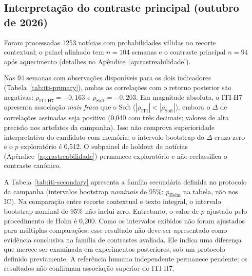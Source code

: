 \subsection{Interpretação do contraste principal (outubro de 2026)}
\label{subsec:campanha-iti}

Foram processadas 1253 notícias com probabilidades válidas no recorte contextual; o painel alinhado tem $n=104$ semanas e o contraste principal $n=94$ após aquecimento (detalhes no Apêndice~\ref{ap:rastreabilidade}).

Nas 94 semanas com observações disponíveis para os dois indicadores (Tabela~\ref{tab:iti-primary}), ambas as correlações com o retorno posterior são negativas: $\rho_{\mathrm{ITI\text{-}H7}}=-0,163$ e $\rho_{\mathrm{Soft}}=-0,203$. Em magnitude absoluta, o ITI-H7 apresenta associação \emph{mais fraca} que o Soft ($|\rho_{\mathrm{ITI}}|<|\rho_{\mathrm{Soft}}|$), embora o $\Delta$ de correlações assinadas seja positivo (0,040 com três decimais; valores de alta precisão nos artefatos da campanha). Isso não comprova superioridade interpretativa do candidato com memória; o intervalo bootstrap do $\Delta$ cruza zero e o $p$ exploratório é 0,512.  O subpainel de holdout de notícias (Apêndice~\ref{ap:rastreabilidade}) permanece exploratório e não reclassifica o contraste canônico.

A Tabela~\ref{tab:iti-secondary} apresenta a família secundária definida no protocolo da campanha (intervalos bootstrap \emph{nominais} de 95\%; $p_{\mathrm{Holm}}$ na tabela, não nos IC). Na comparação entre recorte contextual e texto integral, o intervalo bootstrap nominal de 95\% não inclui zero. Entretanto, o valor de $p$ ajustado pelo procedimento de Holm é 0,200. Como os intervalos exibidos não foram ajustados para múltiplas comparações, esse resultado não deve ser apresentado como evidência conclusiva na família de contrastes avaliada. Ele indica uma diferença que merece ser examinada em experimentos posteriores, sob um protocolo definido previamente. A referência humana independente permanece pendente; os resultados não confirmam associação superior do ITI-H7.
